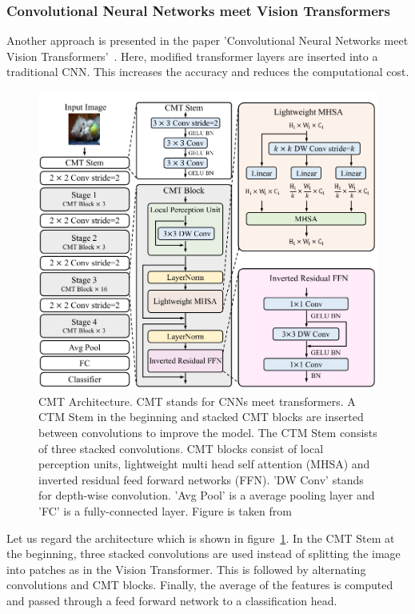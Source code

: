 \documentclass[a4paper]{scrartcl}
\begin{document}
    \subsubsection{Convolutional Neural Networks meet Vision Transformers}
    Another approach is presented in the paper 'Convolutional Neural Networks meet Vision Transformers'~\cite{guo2021cmt}.
    Here, modified transformer layers are inserted into a traditional CNN\@.
    This increases the accuracy and reduces the computational cost.

    \begin{figure}[btp]
        \centering
        \includegraphics[width=0.7\linewidth]{img/CmtArchitecture}
        \caption[CMT Architecture]{CMT Architecture.
        CMT stands for CNNs meet transformers.
        A CTM Stem in the beginning and stacked CMT blocks are inserted between convolutions to improve the model.
        The CTM Stem consists of three stacked convolutions.
        CMT blocks consist of local perception units, lightweight multi head self attention (MHSA) and inverted residual feed forward networks (FFN).
        'DW Conv' stands for depth-wise convolution.
        'Avg Pool' is a average pooling layer and 'FC' is a fully-connected layer.
        Figure is taken from~\cite{guo2021cmt}}
        \label{fig:cmt-architecture}
    \end{figure}

    Let us regard the architecture which is shown in figure~\ref{fig:cmt-architecture}.
    In the CMT Stem at the beginning, three stacked convolutions are used instead of splitting the image into patches as in the Vision Transformer.
    This is followed by alternating convolutions and CMT blocks.
    Finally, the average of the features is computed and passed through a feed forward network to a classification head.
\end{document}
